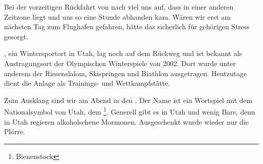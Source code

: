 Bei der vorzeitigen Rückfahrt von  nach  viel uns auf, dass  in einer anderen Zeitzone liegt und uns so eine Stunde abhanden kam.
Wären wir erst am nächsten Tag zum Flughafen gefahren, hätte das sicherlich für gehörigen Stress gesorgt.

, ein Wintersportort in Utah, lag noch auf dem Rückweg und ist bekannt als Austragungsort der Olympischen Winterspiele von 2002.
Dort wurde unter anderem der Riesenslalom, Skispringen und Biathlon ausgetragen.
Heutzutage dient die Anlage als Trainings- und Wettkampfstätte.

Zum Ausklang sind wir am Abend in den .
Der Name ist ein Wortspiel mit dem Nationalsymbol von Utah, dem \footnote{Bienenstock}.
Generell gibt es in Utah und  wenig Bars, denn in Utah regieren alkoholscheue Mormonen.
Ausgeschenkt wurde wieder nur die  Plörre.